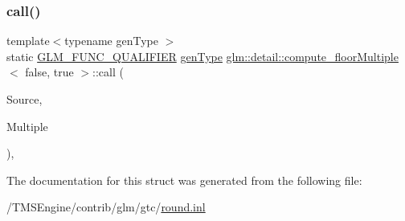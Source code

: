 \subsubsection{\texorpdfstring{call()}{call()}}
{\footnotesize\ttfamily template$<$typename gen\+Type $>$ \\
static \hyperlink{setup_8hpp_a33fdea6f91c5f834105f7415e2a64407}{G\+L\+M\+\_\+\+F\+U\+N\+C\+\_\+\+Q\+U\+A\+L\+I\+F\+I\+ER} \hyperlink{structglm_1_1detail_1_1gen_type}{gen\+Type} \hyperlink{structglm_1_1detail_1_1compute__floor_multiple}{glm\+::detail\+::compute\+\_\+floor\+Multiple}$<$ false, true $>$\+::call (\begin{DoxyParamCaption}\item[{\hyperlink{structglm_1_1detail_1_1gen_type}{gen\+Type}}]{Source,  }\item[{\hyperlink{structglm_1_1detail_1_1gen_type}{gen\+Type}}]{Multiple }\end{DoxyParamCaption})\hspace{0.3cm}{\ttfamily [inline]}, {\ttfamily [static]}}



The documentation for this struct was generated from the following file\+:\begin{DoxyCompactItemize}
\item 
/\+T\+M\+S\+Engine/contrib/glm/gtc/\hyperlink{round_8inl}{round.\+inl}\end{DoxyCompactItemize}

